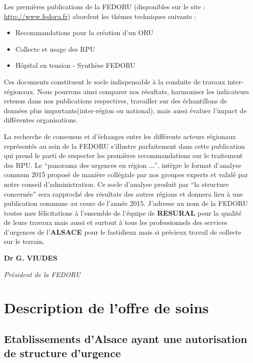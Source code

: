\documentclass[]{article}
\begin{document}
Les premières publications de la FEDORU (disponibles sur le site :
\url{http://www.fedoru.fr}) abordent les thèmes techniques suivants :

\begin{itemize}
\itemsep1pt\parskip0pt
\item
  Recommandations pour la création d'un ORU
\item
  Collecte et usage des RPU
\item
  Hôpital en tension - Synthèse FEDORU
\end{itemize}

Ces documents constituent le socle indispensable à la conduite de
travaux inter-régionaux. Nous pourrons ainsi comparer nos résultats,
harmoniser les indicateurs retenus dans nos publications respectives,
travailler sur des échantillons de données plus importants(inter-région
ou national), mais aussi évaluer l'impact de différentes organisations.

La recherche de consensus et d'échanges entre les différents acteurs
régionaux représentés au sein de la FEDORU s'illustre parfaitement dans
cette publication qui prend le parti de respecter les premières
recommandations sur le traitement des RPU. Le ``panorama des urgences en
région \ldots{}.'', intègre le format d'analyse commun 2015 proposé de
manière collégiale par nos groupes experts et validé par notre conseil
d'administration. Ce socle d'analyse produit par ``la structure
concernée'' sera rapproché des résultats des autres régions et donnera
lieu à une publication commune au cours de l'année 2015. J'adresse au
nom de la FEDORU toutes mes félicitations à l'ensemble de l'équipe de
\textbf{RESURAL} pour la qualité de leurs travaux mais aussi et surtout
à tous les professionnels des services d'urgences de l'\textbf{ALSACE}
pour le fastidieux mais si précieux travail de collecte sur le terrain.

\textbf{Dr G. VIUDES}

\emph{Président de la FEDORU}

\section{Description de l'offre de
soins}\label{description-de-loffre-de-soins}

\subsection{Etablissements d'Alsace ayant une autorisation de structure
d'urgence}\label{etablissements-dalsace-ayant-une-autorisation-de-structure-durgence}
\end{document}
